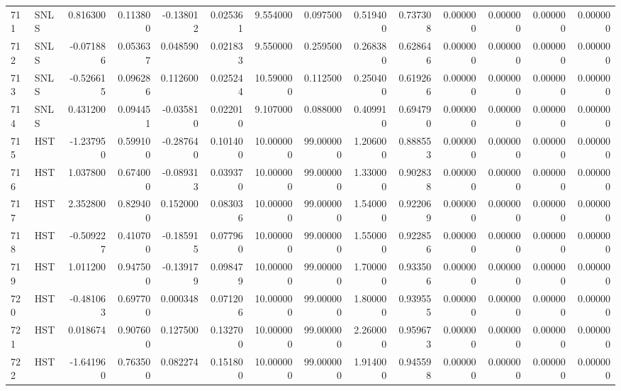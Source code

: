\begin{tabular}{llrrrrrrrrrrrr}
711 &   SNLS &  0.816300 &      0.113800 & -0.138012 &    0.025361 &   9.554000 &      0.097500 &   0.519400 &  0.737308 &  0.000000 &   0.000000 &     0.000000 &     0.000000 \\
712 &   SNLS & -0.071886 &      0.053637 &  0.048590 &    0.021833 &   9.550000 &      0.259500 &   0.268380 &  0.628646 &  0.000000 &   0.000000 &     0.000000 &     0.000000 \\
713 &   SNLS & -0.526615 &      0.096286 &  0.112600 &    0.025244 &  10.590000 &      0.112500 &   0.250400 &  0.619266 &  0.000000 &   0.000000 &     0.000000 &     0.000000 \\
714 &   SNLS &  0.431200 &      0.094451 & -0.035810 &    0.022010 &   9.107000 &      0.088000 &   0.409910 &  0.694790 &  0.000000 &   0.000000 &     0.000000 &     0.000000 \\
715 &    HST & -1.237950 &      0.599100 & -0.287640 &    0.101400 &  10.000000 &     99.000000 &   1.206000 &  0.888553 &  0.000000 &   0.000000 &     0.000000 &     0.000000 \\
716 &    HST &  1.037800 &      0.674000 & -0.089313 &    0.039370 &  10.000000 &     99.000000 &   1.330000 &  0.902838 &  0.000000 &   0.000000 &     0.000000 &     0.000000 \\
717 &    HST &  2.352800 &      0.829400 &  0.152000 &    0.083036 &  10.000000 &     99.000000 &   1.540000 &  0.922069 &  0.000000 &   0.000000 &     0.000000 &     0.000000 \\
718 &    HST & -0.509227 &      0.410700 & -0.185915 &    0.077960 &  10.000000 &     99.000000 &   1.550000 &  0.922856 &  0.000000 &   0.000000 &     0.000000 &     0.000000 \\
719 &    HST &  1.011200 &      0.947500 & -0.139179 &    0.098479 &  10.000000 &     99.000000 &   1.700000 &  0.933506 &  0.000000 &   0.000000 &     0.000000 &     0.000000 \\
720 &    HST & -0.481063 &      0.697700 &  0.000348 &    0.071206 &  10.000000 &     99.000000 &   1.800000 &  0.939555 &  0.000000 &   0.000000 &     0.000000 &     0.000000 \\
721 &    HST &  0.018674 &      0.907600 &  0.127500 &    0.132700 &  10.000000 &     99.000000 &   2.260000 &  0.959673 &  0.000000 &   0.000000 &     0.000000 &     0.000000 \\
722 &    HST & -1.641960 &      0.763500 &  0.082274 &    0.151800 &  10.000000 &     99.000000 &   1.914000 &  0.945598 &  0.000000 &   0.000000 &     0.000000 &     0.000000 \\

\end{tabular}
